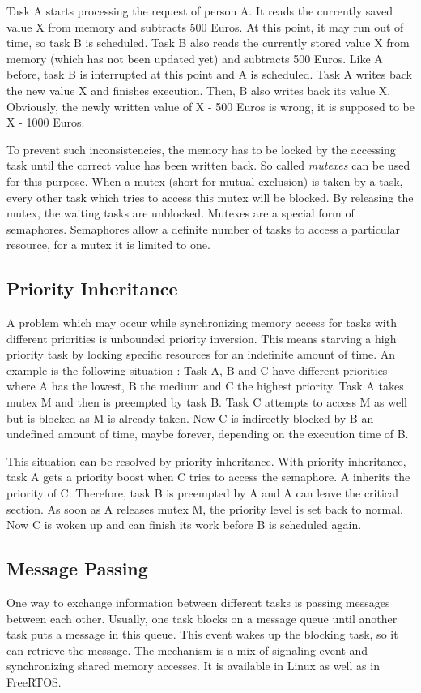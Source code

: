 Task A starts processing the request of person A.
It reads the currently saved value X from memory and subtracts 500 Euros.
At this point, it may run out of time, so task B is scheduled.
Task B also reads the currently stored value X from memory (which has not been updated yet) and subtracts 500 Euros.
Like A before, task B is interrupted at this point and A is scheduled.
Task A writes back the new value X and finishes execution.
Then, B also writes back its value X.
Obviously, the newly written value of X - 500 Euros is wrong, it is supposed to be X - 1000 Euros. 
\par
To prevent such inconsistencies, the memory has to be locked by the accessing task until the correct value has been written back.
So called \textit{mutexes} can be used for this purpose.
When a mutex (short for mutual exclusion) is taken by a task, every other task which tries to access this mutex will be blocked.
By releasing the mutex, the waiting tasks are unblocked.
Mutexes are a special form of semaphores.
Semaphores allow a definite number of tasks to access a particular resource, for a mutex it is limited to one.

\subsection{Priority Inheritance}\label{ss_priority_inheritance}
A problem which may occur while synchronizing memory access for tasks with different priorities is unbounded priority inversion.
This means starving a high priority task by locking specific resources for an indefinite amount of time.
An example is the following situation \cite{rostedt:iotrtp}:
Task A, B and C have different priorities where A has the lowest, B the medium and C the highest priority.
Task A takes mutex M and then is preempted by task B.
Task C attempts to access M as well but is blocked as M is already taken.
Now C is indirectly blocked by B an undefined amount of time, maybe forever, depending on the execution time of B.
\par
This situation can be resolved by priority inheritance.
With priority inheritance, task A gets a priority boost when C tries to access the semaphore.
A inherits the priority of C.
Therefore, task B is preempted by A and A can leave the critical section.
As soon as A releases mutex M, the priority level is set back to normal.
Now C is woken up and can finish its work before B is scheduled again.

\subsection{Message Passing}
One way to exchange information between different tasks is passing messages between each other. 
Usually, one task blocks on a message queue until another task puts a message in this queue.
This event wakes up the blocking task, so it can retrieve the message.
The mechanism is a mix of signaling event and synchronizing shared memory accesses.
It is available in Linux as well as in FreeRTOS.

